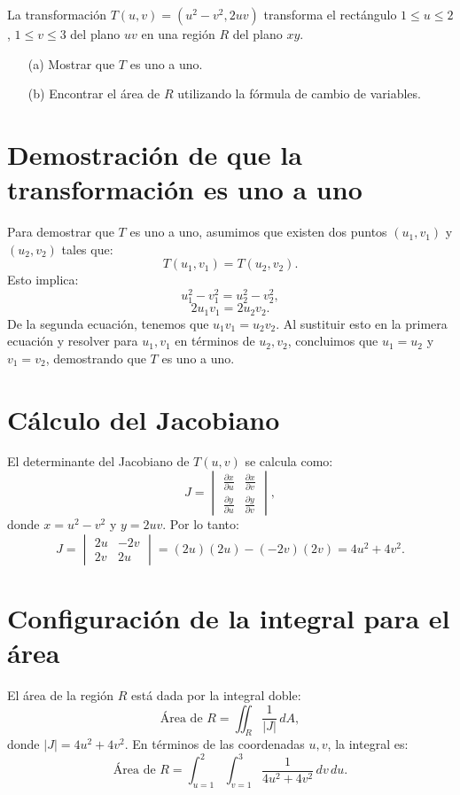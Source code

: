La transformación \( T(u, v) = (u^2 - v^2, 2uv) \) transforma el rectángulo \( 1 \leq u \leq 2 \), \( 1 \leq v \leq 3 \) del plano \( uv \) en una región \( R \) del plano \( xy \).

\begin{enumerate}
    \item[(a)] Mostrar que \( T \) es uno a uno.
    \item[(b)] Encontrar el área de \( R \) utilizando la fórmula de cambio de variables.
\end{enumerate}

\section*{Demostración de que la transformación es uno a uno}

Para demostrar que \( T \) es uno a uno, asumimos que existen dos puntos \((u_1, v_1)\) y \((u_2, v_2)\) tales que:
\[
T(u_1, v_1) = T(u_2, v_2).
\]
Esto implica:
\[
u_1^2 - v_1^2 = u_2^2 - v_2^2,
\]
\[
2u_1v_1 = 2u_2v_2.
\]
De la segunda ecuación, tenemos que \( u_1v_1 = u_2v_2 \). Al sustituir esto en la primera ecuación y resolver para \( u_1, v_1 \) en términos de \( u_2, v_2 \), concluimos que \( u_1 = u_2 \) y \( v_1 = v_2 \), demostrando que \( T \) es uno a uno.

\section*{Cálculo del Jacobiano}

El determinante del Jacobiano de \( T(u, v) \) se calcula como:
\[
J = \begin{vmatrix}
\frac{\partial x}{\partial u} & \frac{\partial x}{\partial v} \\
\frac{\partial y}{\partial u} & \frac{\partial y}{\partial v}
\end{vmatrix},
\]
donde \( x = u^2 - v^2 \) y \( y = 2uv \). Por lo tanto:
\[
J = \begin{vmatrix}
2u & -2v \\
2v & 2u
\end{vmatrix} = (2u)(2u) - (-2v)(2v) = 4u^2 + 4v^2.
\]

\section*{Configuración de la integral para el área}

El área de la región \( R \) está dada por la integral doble:
\[
\text{Área de } R = \iint_R \frac{1}{|J|} \, dA,
\]
donde \( |J| = 4u^2 + 4v^2 \). En términos de las coordenadas \( u, v \), la integral es:
\[
\text{Área de } R = \int_{u=1}^{2} \int_{v=1}^{3} \frac{1}{4u^2 + 4v^2} \, dv \, du.
\]

